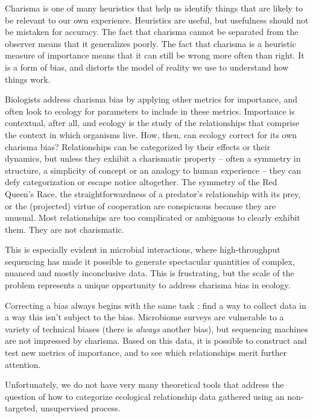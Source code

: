 \documentclass[
10pt, %
a4paper, %
oneside, %
headinclude,footinclude, %
BCOR5mm, %
]{scrartcl}
\begin{document}
Charisma is one of many heuristics that help us identify things that are likely to be relevant to our own experience. Heuristics are useful, but usefulness should not be mistaken for accuracy. The fact that charisma cannot be separated from the observer means that it generalizes poorly. The fact that charisma is a heuristic measure of importance means that it can still be wrong more often than right. It is a form of bias, and distorts the model of reality we use to understand how things work.

Biologists address charisma bias by applying other metrics for importance, and often look to ecology for parameters to include in these metrics. Importance is contextual, after all, and ecology is the study of the relationships that comprise the context in which organisms live. How, then, can ecology correct for its own charisma bias? Relationships can be categorized by their effects or their dynamics, but unless they exhibit a charismatic property -- often a symmetry in structure, a simplicity of concept or an analogy to human experience -- they can defy categorization or escape notice altogether. The symmetry of the Red Queen's Race, the straightforwardness of a predator's relationship with its prey, or the (projected) virtue of cooperation are conspicuous because they are unusual. Most relationships are too complicated or ambiguous to clearly exhibit them. They are not charismatic.





This is especially evident in microbial interactions, where high-throughput sequencing has made it possible to generate spectacular quantities of complex, nuanced and mostly inconclusive data. This is frustrating, but the scale of the problem represents a unique opportunity to address charisma bias in ecology.

Correcting a bias always begins with the same task : find a way to collect data in a way this isn't subject to the bias. Microbiome surveys are vulnerable to a variety of technical biases (there is {\em always} another bias), but sequencing machines are not impressed by charisma. Based on this data, it is possible to construct and test new metrics of importance, and to see which relationships merit further attention.

Unfortunately, we do not have very many theoretical tools that address the question of how to categorize ecological relationship data gathered using an non-targeted, unsupervised process.
\end{document}
